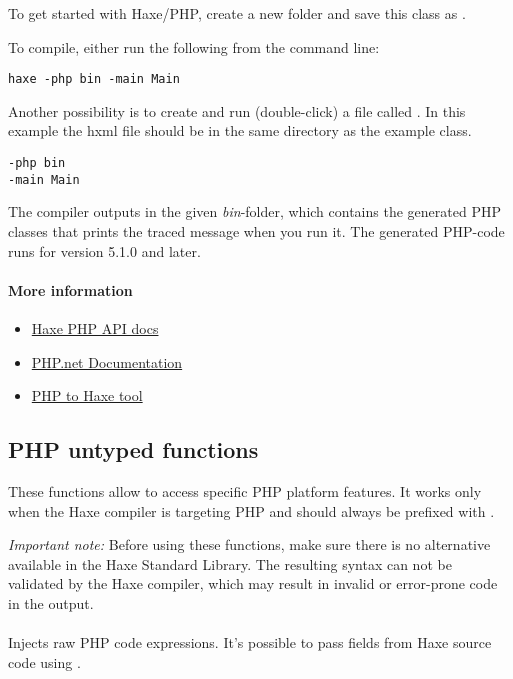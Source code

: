To get started with Haxe/PHP, create a new folder and save this class as .


To compile, either run the following from the command line:

\begin{lstlisting}
haxe -php bin -main Main
\end{lstlisting}

Another possibility is to create and run (double-click) a file called . In this example the hxml file should be in the same directory as the example class.

\begin{lstlisting}
-php bin
-main Main
\end{lstlisting}

The compiler outputs in the given \emph{bin}-folder, which contains the generated PHP classes that prints the traced message when you run it. The generated PHP-code runs for version 5.1.0 and later.

\paragraph{More information}

\begin{itemize}
	\item \href{http://api.haxe.org/php/}{Haxe PHP API docs}
	\item \href{http://php.net/docs.php}{PHP.net Documentation}
	\item \href{http://phptohaxe.haqteam.com/code.php}{PHP to Haxe tool}
\end{itemize}


\subsection{PHP untyped functions}
\label{target-php-untyped}

These functions allow to access specific PHP platform features. It works only when the Haxe compiler is targeting PHP and should always be prefixed with .

\emph{Important note:} Before using these functions, make sure there is no alternative available in the Haxe Standard Library. The resulting syntax can not be validated by the Haxe compiler, which may result in invalid or error-prone code in the output.

\paragraph{}
Injects raw PHP code expressions. It's possible to pass fields from Haxe source code using .

